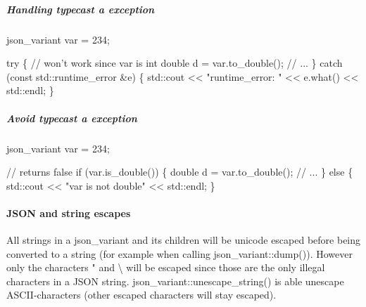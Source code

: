 \subparagraph*{\label{_handling_typecast_expception_section}%
Handling typecast a exception}


\begin{DoxyCode}
json\_variant var = 234;

\textcolor{keywordflow}{try} \{
    \textcolor{comment}{// won't work since var is int}
    \textcolor{keywordtype}{double} d = var.to\_double();  
    \textcolor{comment}{// ...}
\}
\textcolor{keywordflow}{catch} (\textcolor{keyword}{const} std::runtime\_error &e) \{
    std::cout << \textcolor{stringliteral}{"runtime\_error: "} << e.what() << std::endl;   
\} 
\end{DoxyCode}


\subparagraph*{\label{_avoid_typecast_exception_section}%
Avoid typecast a exception}


\begin{DoxyCode}
json\_variant var = 234;

\textcolor{comment}{// returns false}
\textcolor{keywordflow}{if} (var.is\_double()) \{
    \textcolor{keywordtype}{double} d = var.to\_double();   
    \textcolor{comment}{// ...}
\}
\textcolor{keywordflow}{else} \{
    std::cout << \textcolor{stringliteral}{"var is not double"} << std::endl;   
\}
\end{DoxyCode}


\paragraph*{\label{_json_and_string_escapes_section}%
J\+S\+ON and string escapes}

All strings in a {\ttfamily json\+\_\+variant} and its children will be unicode escaped before being converted to a string (for example when calling {\ttfamily json\+\_\+variant\+::dump()}). However only the characters " and \textbackslash{} will be escaped since those are the only illegal characters in a J\+S\+ON string. json\+\_\+variant\+::unescape\+\_\+string() is able unescape A\+S\+C\+I\+I-\/characters (other escaped characters will stay escaped).



